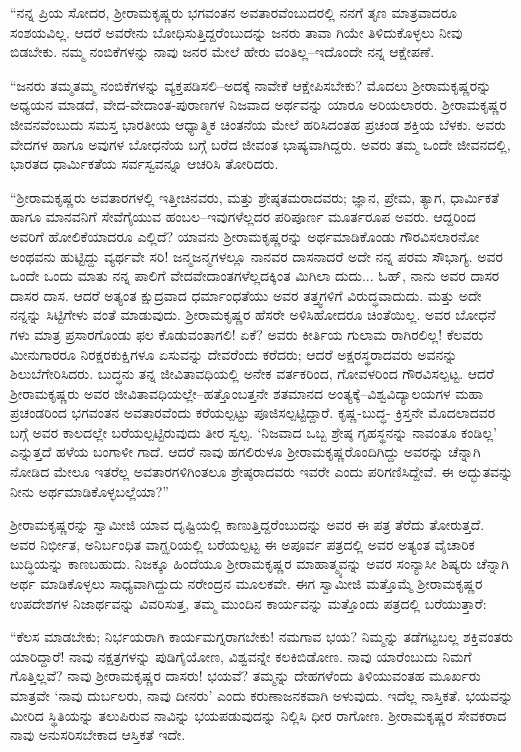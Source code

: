“ನನ್ನ ಪ್ರಿಯ ಸೋದರ, ಶ್ರೀರಾಮಕೃಷ್ಣರು ಭಗವಂತನ ಅವತಾರವೆಂಬುದರಲ್ಲಿ ನನಗೆ ತೃಣ ಮಾತ್ರವಾದರೂ ಸಂಶಯವಿಲ್ಲ. ಆದರೆ ಅವರೇನು ಬೋಧಿಸುತ್ತಿದ್ದರೆಂಬುದನ್ನು ಜನರು ತಾವಾ ಗಿಯೇ ತಿಳಿದುಕೊಳ್ಳಲು ನೀವು ಬಿಡಬೇಕು. ನಮ್ಮ ನಂಬಿಕೆಗಳನ್ನು ನಾವು ಜನರ ಮೇಲೆ ಹೇರು ವಂತಿಲ್ಲ–ಇದೊಂದೇ ನನ್ನ ಆಕ್ಷೇಪಣೆ.

“ಜನರು ತಮ್ಮತಮ್ಮ ನಂಬಿಕೆಗಳನ್ನು ವ್ಯಕ್ತಪಡಿಸಲಿ–ಅದಕ್ಕೆ ನಾವೇಕೆ ಆಕ್ಷೇಪಿಸಬೇಕು? ಮೊದಲು ಶ್ರೀರಾಮಕೃಷ್ಣರನ್ನು ಅಧ್ಯಯನ ಮಾಡದೆ, ವೇದ-ವೇದಾಂತ-ಪುರಾಣಗಳ ನಿಜವಾದ ಅರ್ಥವನ್ನು ಯಾರೂ ಅರಿಯಲಾರರು. ಶ್ರೀರಾಮಕೃಷ್ಣರ ಜೀವನವೆಂಬುದು ಸಮಸ್ತ ಭಾರತೀಯ ಆಧ್ಯಾತ್ಮಿಕ ಚಿಂತನೆಯ ಮೇಲೆ ಹರಿಸಿದಂತಹ ಪ್ರಚಂಡ ಶಕ್ತಿಯ ಬೆಳಕು. ಅವರು ವೇದಗಳ ಹಾಗೂ ಅವುಗಳ ಬೋಧನೆಯ ಬಗ್ಗೆ ಬರೆದ ಜೀವಂತ ಭಾಷ್ಯವಾಗಿದ್ದರು. ಅವರು ತಮ್ಮ ಒಂದೇ ಜೀವನದಲ್ಲಿ, ಭಾರತದ ಧಾರ್ಮಿಕತೆಯ ಸರ್ವಸ್ವವನ್ನೂ ಆಚರಿಸಿ ತೋರಿದರು.

“ಶ್ರೀರಾಮಕೃಷ್ಣರು ಅವತಾರಗಳಲ್ಲಿ ಇತ್ತೀಚಿನವರು, ಮತ್ತು ಶ್ರೇಷ್ಠತಮರಾದವರು; ಜ್ಞಾನ, ಪ್ರೇಮ, ತ್ಯಾಗ, ಧಾರ್ಮಿಕತೆ ಹಾಗೂ ಮಾನವನಿಗೆ ಸೇವೆಗೈಯುವ ಹಂಬಲ–ಇವುಗಳೆಲ್ಲದರ ಪರಿಪೂರ್ಣ ಮೂರ್ತರೂಪ ಅವರು. ಆದ್ದರಿಂದ ಅವರಿಗೆ ಹೋಲಿಕೆಯಾದರೂ ಎಲ್ಲಿದೆ? ಯಾವನು ಶ್ರೀರಾಮಕೃಷ್ಣರನ್ನು ಅರ್ಥಮಾಡಿಕೊಂಡು ಗೌರವಿಸಲಾರನೋ ಅಂಥವನು ಹುಟ್ಟಿದ್ದು ವ್ಯರ್ಥವೇ ಸರಿ! ಜನ್ಮಜನ್ಮಗಳಲ್ಲೂ ನಾನವರ ದಾಸನಾದರೆ ಅದೇ ನನ್ನ ಪರಮ ಸೌಭಾಗ್ಯ. ಅವರ ಒಂದೇ ಒಂದು ಮಾತು ನನ್ನ ಪಾಲಿಗೆ ವೇದವೇದಾಂತಗಳೆಲ್ಲದಕ್ಕಿಂತ ಮಿಗಿಲಾ ದುದು... ಓಹ್, ನಾನು ಅವರ ದಾಸರ ದಾಸರ ದಾಸ. ಆದರೆ ಅತ್ಯಂತ ಕ್ಷುದ್ರವಾದ ಧರ್ಮಾಂಧತೆಯು ಅವರ ತತ್ತ್ವಗಳಿಗೆ ವಿರುದ್ಧವಾದುದು. ಮತ್ತು ಅದೇ ನನ್ನನ್ನು ಸಿಟ್ಟಿಗೇಳು ವಂತೆ ಮಾಡುವುದು. ಶ್ರೀರಾಮಕೃಷ್ಣರ ಹೆಸರೇ ಅಳಿಸಿಹೋದರೂ ಚಿಂತೆಯಿಲ್ಲ. ಅವರ ಬೋಧನೆ ಗಳು ಮಾತ್ರ ಪ್ರಸಾರಗೊಂಡು ಫಲ ಕೊಡುವಂತಾಗಲಿ! ಏಕೆ? ಅವರು ಕೀರ್ತಿಯ ಗುಲಾಮ ರಾಗಿರಲಿಲ್ಲ! ಕೆಲವರು ಮೀನುಗಾರರೂ ನಿರಕ್ಷರಕುಕ್ಷಿಗಳೂ ಏಸುವನ್ನು ದೇವರೆಂದು ಕರೆದರು; ಆದರೆ ಅಕ್ಷರಸ್ಥರಾದವರು ಅವನನ್ನು ಶಿಲುಬೆಗೇರಿಸಿದರು. ಬುದ್ಧನು ತನ್ನ ಜೀವಿತಾವಧಿಯಲ್ಲಿ ಅನೇಕ ವರ್ತಕರಿಂದ, ಗೋವಳರಿಂದ ಗೌರವಿಸಲ್ಪಟ್ಟ. ಆದರೆ ಶ್ರೀರಾಮಕೃಷ್ಣರು ಅವರ ಜೀವಿತಾವಧಿಯಲ್ಲೇ–ಹತ್ತೊಂಬತ್ತನೇ ಶತಮಾನದ ಅಂತ್ಯಕ್ಕೆ–ವಿಶ್ವವಿದ್ಯಾಲಯಗಳ ಮಹಾ ಪ್ರಚಂಡರಿಂದ ಭಗವಂತನ ಅವತಾರವೆಂದು ಕರೆಯಲ್ಪಟ್ಟು ಪೂಜಿಸಲ್ಪಟ್ಟಿದ್ದಾರೆ. ಕೃಷ್ಣ-ಬುದ್ಧ- ಕ್ರಿಸ್ತನೇ ಮೊದಲಾದವರ ಬಗ್ಗೆ ಅವರ ಕಾಲದಲ್ಲೇ ಬರೆಯಲ್ಪಟ್ಟಿರುವುದು ತೀರ ಸ್ವಲ್ಪ. ‘ನಿಜವಾದ ಒಬ್ಬ ಶ್ರೇಷ್ಠ ಗೃಹಸ್ಥನನ್ನು ನಾವಂತೂ ಕಂಡಿಲ್ಲ’ ಎನ್ನುತ್ತದೆ ಹಳೆಯ ಬಂಗಾಳೀ ಗಾದೆ. ಆದರೆ ನಾವು ಹಗಲಿರುಳೂ ಶ್ರೀರಾಮಕೃಷ್ಣರೊಂದಿಗಿದ್ದು ಅವರನ್ನು ಚೆನ್ನಾಗಿ ನೋಡಿದ ಮೇಲೂ ಇತರೆಲ್ಲ ಅವತಾರಗಳಿಗಿಂತಲೂ ಶ್ರೇಷ್ಠರಾದವರು ಇವರೇ ಎಂದು ಪರಿಗಣಿಸಿದ್ದೇವೆ. ಈ ಅದ್ಭುತವನ್ನು ನೀನು ಅರ್ಥಮಾಡಿಕೊಳ್ಳಬಲ್ಲೆಯಾ?”

ಶ್ರೀರಾಮಕೃಷ್ಣರನ್ನು ಸ್ವಾಮೀಜಿ ಯಾವ ದೃಷ್ಟಿಯಲ್ಲಿ ಕಾಣುತ್ತಿದ್ದರೆಂಬುದನ್ನು ಅವರ ಈ ಪತ್ರ ತೆರೆದು ತೋರುತ್ತದೆ. ಅವರ ನಿರ್ಭೀತ, ಅನಿರ್ಬಂಧಿತ ವಾಗ್ಝರಿಯಲ್ಲಿ ಬರೆಯಲ್ಪಟ್ಟ ಈ ಅಪೂರ್ವ ಪತ್ರದಲ್ಲಿ ಅವರ ಅತ್ಯಂತ ವೈಚಾರಿಕ ಬುದ್ಧಿಯನ್ನು ಕಾಣಬಹುದು. ನಿಜಕ್ಕೂ ಹಿಂದೆಯೂ ಶ್ರೀರಾಮಕೃಷ್ಣರ ಮಾಹಾತ್ಮ್ಯವನ್ನು ಅವರ ಸಂನ್ಯಾಸೀ ಶಿಷ್ಯರು ಚೆನ್ನಾಗಿ ಅರ್ಥ ಮಾಡಿಕೊಳ್ಳಲು ಸಾಧ್ಯವಾಗಿದ್ದುದು ನರೇಂದ್ರನ ಮೂಲಕವೇ. ಈಗ ಸ್ವಾಮೀಜಿ ಮತ್ತೊಮ್ಮೆ ಶ್ರೀರಾಮಕೃಷ್ಣರ ಉಪದೇಶಗಳ ನಿಜಾರ್ಥವನ್ನು ವಿವರಿಸುತ್ತ, ತಮ್ಮ ಮುಂದಿನ ಕಾರ್ಯವನ್ನು ಮತ್ತೊಂದು ಪತ್ರದಲ್ಲಿ ಬರೆಯುತ್ತಾರೆ:

“ಕೆಲಸ ಮಾಡಬೇಕು; ನಿರ್ಭಯರಾಗಿ ಕಾರ್ಯಮಗ್ನರಾಗಬೇಕು! ನಮಗಾವ ಭಯ? ನಿಮ್ಮನ್ನು ತಡೆಗಟ್ಟಬಲ್ಲ ಶಕ್ತಿವಂತರು ಯಾರಿದ್ದಾರೆ! ನಾವು ನಕ್ಷತ್ರಗಳನ್ನು ಪುಡಿಗೈಯೋಣ, ವಿಶ್ವವನ್ನೇ ಕಲಕಿಬಿಡೋಣ. ನಾವು ಯಾರೆಂಬುದು ನಿಮಗೆ ಗೊತ್ತಿಲ್ಲವೆ? ನಾವು ಶ್ರೀರಾಮಕೃಷ್ಣರ ದಾಸರು! ಭಯವೆ? ತಮ್ಮನ್ನು ದೇಹಗಳೆಂದು ತಿಳಿಯುವಂತಹ ಮೂರ್ಖರು ಮಾತ್ರವೇ ‘ನಾವು ದುರ್ಬಲರು, ನಾವು ದೀನರು’ ಎಂದು ಕರುಣಾಜನಕವಾಗಿ ಅಳುವುದು. ಇದೆಲ್ಲ ನಾಸ್ತಿಕತೆ. ಭಯವನ್ನು ಮೀರಿದ ಸ್ಥಿತಿಯನ್ನು ತಲುಪಿರುವ ನಾವಿನ್ನು ಭಯಪಡುವುದನ್ನು ನಿಲ್ಲಿಸಿ ಧೀರ ರಾಗೋಣ. ಶ್ರೀರಾಮಕೃಷ್ಣರ ಸೇವಕರಾದ ನಾವು ಅನುಸರಿಸಬೇಕಾದ ಆಸ್ತಿಕತೆ ಇದೇ.

